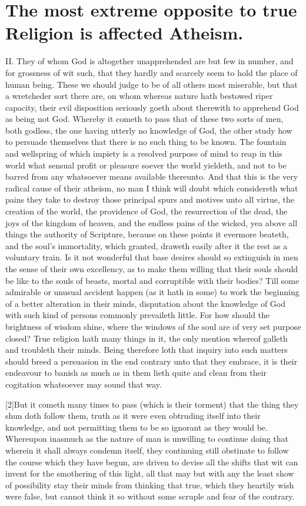 \section*{The most extreme opposite to true Religion is affected Atheism.}
II. They of whom God is altogether unapprehended are but few in number, and for grossness of wit such, that they hardly and scarcely seem to hold the place of human being. These we should judge to be of all others most miserable, but that a wretcheder sort there are, on whom whereas nature hath bestowed riper capacity, their evil disposition seriously goeth about therewith to apprehend God as being not God. Whereby it cometh to pass that of these two sorts of men, both godless, the one having utterly no knowledge of God, the other study how to persuade themselves that there is no such thing to be known. The fountain and wellspring of which impiety is a resolved purpose of mind to reap in this world what sensual profit or pleasure soever the world yieldeth, and not to be barred from any whatsoever means available thereunto. And that this is the very radical cause of their atheism, no man I think will doubt which considereth what pains they take to destroy those principal spurs and motives unto all virtue, the creation of the world, the providence of God, the resurrection of the dead, the joys of the kingdom of heaven, and the endless pains of the wicked, yea above all things the authority of Scripture, because on these points it evermore beateth, and the soul’s immortality, which granted, draweth easily after it the rest as a voluntary train. Is it not wonderful that base desires should so extinguish in men the sense of their own excellency, as to make them willing that their souls should be like to the souls of beasts, mortal and corruptible with their bodies? Till some admirable or unusual accident happen (as it hath in some) to work the beginning of a better alteration in their minds, disputation about the  knowledge of God with such kind of persons commonly prevaileth little.
 For how should the brightness of wisdom shine, where the windows of the soul are of very set purpose closed? True religion hath many things in it, the only mention whereof galleth and troubleth their minds. Being therefore loth that inquiry into such matters should breed a persuasion in the end contrary unto that they embrace, it is their endeavour to banish as much as in them lieth quite and clean from their cogitation whatsoever may sound that way.

[2]But it cometh many times to pass (which is their torment) that the thing they shun doth follow them, truth as it were even obtruding itself into their knowledge, and not permitting them to be so ignorant as they would be. Whereupon inasmuch as the nature of man is unwilling to continue doing that wherein it shall always condemn itself, they continuing still obstinate to follow the course which they have begun, are driven to devise all the shifts that wit can invent for the smothering of this light, all that may but with any the least show of possibility stay their minds from thinking that true, which they heartily wish were false, but cannot think it so without some scruple and fear of the contrary.

